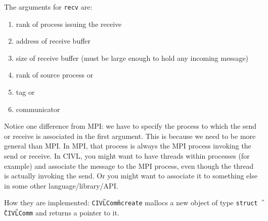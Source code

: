 \documentclass[11pt]{article}
\begin{document}
The arguments for \texttt{recv} are:
\begin{enumerate}
\item rank of process issuing the receive
\item address of receive buffer
\item size of receive buffer (must be large enough to hold any incoming message)
\item rank of source process or 
\item tag or 
\item communicator
\end{enumerate}

Notice one difference from MPI: we have to specify the process to
which the send or receive is associated in the first argument. This is
because we need to be more general than MPI. In MPI, that process is
always the MPI process invoking the send or receive. In CIVL, you
might want to have threads within processes (for example) and
associate the message to the MPI process, even though the thread is
actually invoking the send. Or you might want to associate it to
something else in some other language/library/API.

How they are implemented: \texttt{CIVL{\U}Comm{\U}create}
mallocs a new object of type \texttt{struct {\U}CIVL{\U}Comm} and returns
a pointer to it.










\appendix
\end{document}
